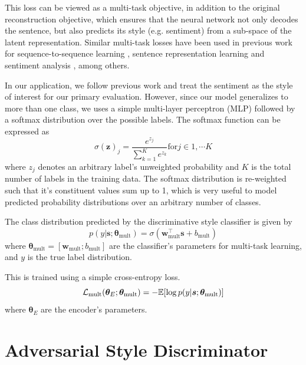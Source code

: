 This loss can be viewed as a multi-task objective, in addition to the original reconstruction objective, which ensures that the neural network not only decodes the sentence, but also predicts its style (e.g. sentiment) from a sub-space of the latent representation. Similar multi-task losses have been used in previous work for sequence-to-sequence learning \citep{luong2015multi}, sentence representation learning \citep{jernite2017discourse} and sentiment analysis \citep{balikas2017multitask}, among others.

In our application, we follow previous work \citep{hu2017toward,shen2017style,fu2017style} and treat the sentiment as the style of interest for our primary evaluation. However, since our model generalizes to more than one class, we uses a simple multi-layer perceptron (MLP) followed by a softmax distribution over the possible labels. The softmax function can be expressed as
\begin{equation*}
	\sigma(\mathbf{z})_j = \frac{e^{z_j}}{\sum_{k=1}^K e^{z_k}} \text{for} j \in {1, \cdots K}
\end{equation*}
where $z_j$ denotes an arbitrary label's unweighted probability and $K$ is the total number of labels in the training data. The softmax distribution is re-weighted such that it's constituent values sum up to 1, which is very useful to model predicted probability distributions over an arbitrary number of classes.

The class distribution predicted by the discriminative style classifier is given by
\begin{equation} \label{eqn:class-pred}
	p(y | \bm s; \bm\theta_\text{mult}) = \sigma(\bm w_\text{mult}^\top \bm s + b_\text{mult})
\end{equation}
where $\bm\theta_\text{mult}=[\bm w_\text{mult}; b_\text{mult}]$ are the classifier's parameters for multi-task learning, and $y$ is the true label distribution.

This is trained using a simple cross-entropy loss.
\begin{equation} \label{eqn:multi-task-loss}
	\mathcal{L}_\text{mult}(\bm\theta_{E};\bm\theta_\text{mult}) =
	- \mathbb{E} [\log p(y | \bm s; \bm\theta_\text{mult})]
\end{equation}
where $\bm\theta_E$ are the encoder's parameters.


\section{Adversarial Style Discriminator} \label{sec:adversarial-style-objective}


